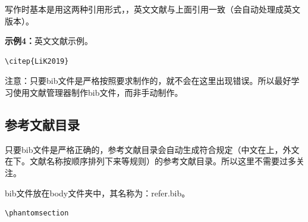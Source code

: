 写作时基本是用这两种引用形式，，英文文献与上面引用一致（会自动处理成英文版本）。

\textbf{示例4：}英文文献示例\citep{LiK2019}。
\begin{lstlisting}
\citep{LiK2019}
\end{lstlisting}


注意：只要bib文件是严格按照要求制作的，就不会在这里出现错误。所以最好学习使用文献管理器制作bib文件，而非手动制作。
\subsection{参考文献目录}

只要bib文件是严格正确的，参考文献目录会自动生成符合规定（中文在上，外文在下。文献名称按顺序排列下来等规则）的参考文献目录。所以这里不需要过多关注。

bib文件放在body文件夹中，其名称为：refer.bib。
\begin{lstlisting}
\phantomsection

\end{lstlisting}
